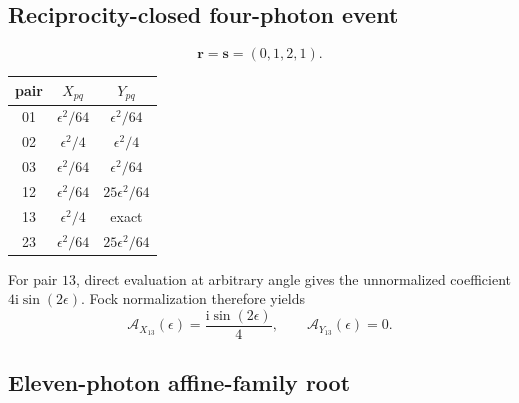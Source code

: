 \documentclass[aps,pra,onecolumn,amsmath,amssymb,superscriptaddress,longbibliography]{revtex4-2}
\newcommand{\ii}{\mathrm{i}}
\begin{document}
\subsection{Reciprocity-closed four-photon event}

\begin{equation}
\bm r=\bm s=(0,1,2,1).
\end{equation}
\begin{center}
\begin{tabular}{ccc}
\toprule
pair&$X_{pq}$&$Y_{pq}$\\
\midrule
01&$\epsilon^2/64$&$\epsilon^2/64$\\
02&$\epsilon^2/4$&$\epsilon^2/4$\\
03&$\epsilon^2/64$&$\epsilon^2/64$\\
12&$\epsilon^2/64$&$25\epsilon^2/64$\\
13&$\epsilon^2/4$&exact\\
23&$\epsilon^2/64$&$25\epsilon^2/64$\\
\bottomrule
\end{tabular}
\end{center}

For pair $13$, direct evaluation at arbitrary angle gives the unnormalized
coefficient $4\ii\sin(2\epsilon)$.  Fock normalization therefore yields
\begin{equation}
\mathcal A_{X_{13}}(\epsilon)=
\frac{\ii\sin(2\epsilon)}{4},\qquad
\mathcal A_{Y_{13}}(\epsilon)=0.
\end{equation}

\subsection{Eleven-photon affine-family root}
\end{document}
